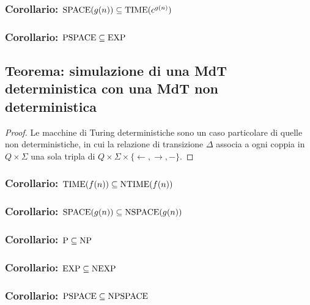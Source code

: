 \subsubsection{Corollario: $\text{SPACE}(g(n)) \subseteq \text{TIME}(c^{g(n)})$}
\subsubsection{Corollario: $\text{PSPACE} \subseteq \text{EXP}$}

\subsection{Teorema: simulazione di una MdT deterministica con una MdT non deterministica}
\label{theorem:deterministic_to_non_deterministic}
\begin{proof}
Le macchine di Turing deterministiche sono un caso particolare di quelle non deterministiche, in cui la relazione di transizione $\Delta$ associa a ogni coppia in $Q \times \Sigma$ una sola tripla di $Q \times \Sigma \times \{\leftarrow, \rightarrow, -\}$.
\end{proof}
\subsubsection{Corollario: $\text{TIME}(f(n)) \subseteq \text{NTIME}(f(n))$}
\subsubsection{Corollario: $\text{SPACE}(g(n)) \subseteq \text{NSPACE}(g(n))$}
\subsubsection{Corollario: $\text{P} \subseteq \text{NP}$}
\subsubsection{Corollario: $\text{EXP} \subseteq \text{NEXP}$}
\subsubsection{Corollario: $\text{PSPACE} \subseteq \text{NPSPACE}$}

